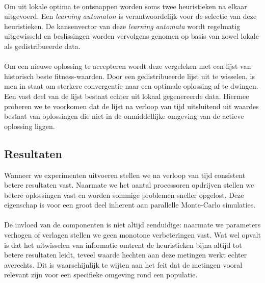 \paragraph{}
Om uit lokale optima te ontsnappen worden soms twee heuristieken na elkaar uitgevoerd. Een \emph{learning automaton} is verantwoordelijk voor de selectie van deze heuristieken. De kansenvector van deze \emph{learning automata} wordt regelmatig uitgewisseld en beslissingen worden vervolgens genomen op basis van zowel lokale als gedistribueerde data.

\paragraph{}
Om een nieuwe oplossing te accepteren wordt deze vergeleken met een lijst van historisch beste fitness-waarden. Door een gedistribueerde lijst uit te wisselen, is men in staat om sterkere convergentie naar een optimale oplossing af te dwingen. Een vast deel van de lijst bestaat echter uit lokaal gegenereerde data. Hiermee proberen we te voorkomen dat de lijst na verloop van tijd uitsluitend uit waardes bestaat van oplossingen die niet in de onmiddellijke omgeving van de actieve oplossing liggen.%

\subsection{Resultaten}

Wanneer we experimenten uitvoeren stellen we na verloop van tijd consistent betere resultaten vast. Naarmate we het aantal processoren opdrijven stellen we betere oplossingen vast en worden sommige problemen sneller opgelost. Deze eigenschap is voor een groot deel inherent aan parallelle Monte-Carlo simulaties.

\paragraph{}
De invloed van de componenten is niet altijd eenduidige: naarmate we parameters verhogen of verlagen stellen we geen monotone verbeteringen vast. Wat wel opvalt is dat het uitwisselen van informatie omtrent de heuristieken bijna altijd tot betere resultaten leidt, teveel waarde hechten aan deze metingen werkt echter averechts. Dit is waarschijnlijk te wijten aan het feit dat de metingen vooral relevant zijn voor een specifieke omgeving rond een populatie.

